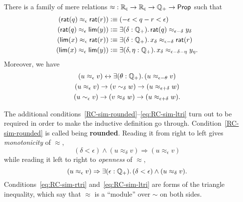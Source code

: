 
\begin{thm}\label{defn:RC-approx}
  There is a family of mere relations $\mathord\approx:\mathbb{R}_\mathsf{c}\to\mathbb{R}_\mathsf{c}\to\mathbb{Q}_{+}\to\mathsf{Prop}$ such that
  \begin{align}
    (\rcrat(q) \approx_\epsilon \rcrat(r))  &\defeq
    (-\epsilon < q - r < \epsilon)\label{eq:RCappx1}\\
    (\rcrat(q) \approx_\epsilon \rclim(y)) &\defeq
    \exis{\delta : \Qp} \rcrat(q) \approx_{\epsilon - \delta} y_\delta\label{eq:RCappx2}\\
    (\rclim(x) \approx_\epsilon \rcrat(r)) &\defeq
    \exis{\delta : \Qp} x_\delta \approx_{\epsilon - \delta} \rcrat(r)\label{eq:RCappx3}\\
    (\rclim(x) \approx_\epsilon \rclim(y)) &\defeq
    \exis{\delta, \eta : \Qp} x_\delta \approx_{\epsilon - \delta - \eta} y_\eta.\label{eq:RCappx4}
  \end{align}
  Moreover, we have
  \begin{gather}
    (u \approx_\epsilon v) \leftrightarrow \exis{\theta:\Qp} (u \approx_{\epsilon-\theta} v) \label{RC-sim-rounded}\\
    (u \approx_\epsilon v) \to (v\sim_\delta w) \to (u\approx_{\epsilon+\delta} w)\label{eq:RC-sim-rtri}\\ 
    (u \sim_\epsilon v) \to (v\approx_\delta w) \to (u\approx_{\epsilon+\delta} w)\label{eq:RC-sim-ltri}.
  \end{gather}
\end{thm}

The additional conditions~\eqref{RC-sim-rounded}--\eqref{eq:RC-sim-ltri} turn out to be required in order to make the inductive definition go through.
Condition~\eqref{RC-sim-rounded} is called being \textbf{rounded}.
Reading it from right to left gives \emph{monotonicity} of $\approx$,
%
\begin{equation*}
  (\delta < \epsilon) \land (u \approx_\delta v) \Rightarrow (u \approx_\epsilon v)
\end{equation*}
%
while reading it left to right to \emph{openness} of $\approx$,
%
\begin{equation*}
  (u \approx_\epsilon v) \Rightarrow \exis{\epsilon : \Qp} (\delta < \epsilon) \land (u \approx_\delta v).
\end{equation*}
%
Conditions~\eqref{eq:RC-sim-rtri} and~\eqref{eq:RC-sim-ltri} are forms of the triangle inequality, which say that $\approx$ is a ``module'' over $\sim$ on both sides.

